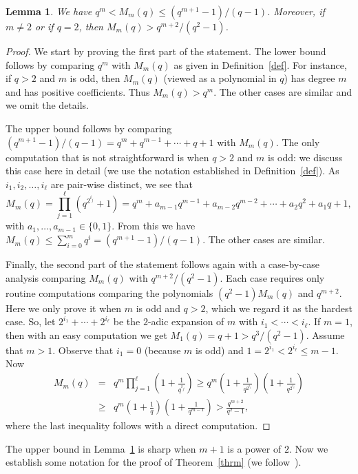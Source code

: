 \documentclass{amsart}
\newtheorem{lemma}[theorem]{Lemma}
\begin{document}
\begin{lemma}\label{estimate}We have $q^m< M_{m}(q)\leq (q^{m+1}-1)/(q-1)$. Moreover, if $m\neq 2$ or if $q=2$, then $M_m(q)>q^{m+2}/(q^2-1)$.
\end{lemma}
\begin{proof}
We start by proving the first part of the statement.
The lower bound follows by comparing $q^m$ with $M_m(q)$ as given in  Definition~\ref{def}. For instance, if $q>2$ and $m$ is odd, then $M_m(q)$  (viewed as a polynomial in $q$) has degree $m$ and has positive coefficients. Thus $M_m(q)>q^m$. The other cases are similar and we omit the details.

The upper bound follows by comparing $(q^{m+1}-1)/(q-1)=q^{m}+q^{m-1}+\cdots +q+1$ with $M_m(q)$. The only computation that is not straightforward is when $q>2$ and $m$ is odd: we discuss this case here in detail (we use the notation established in Definition~\ref{def}). As $i_1,i_2,\ldots ,i_\ell$ are pair-wise distinct, we see that $$M_m(q)=\prod_{j=1}^\ell(q^{2^{i_j}}+1)=q^m+a_{m-1}q^{m-1}+a_{m-2}q^{m-2}+\cdots +a_2q^2+a_1q+1,$$
with $a_1,\ldots,a_{m-1}\in \{0,1\}$. From this we have $M_m(q)\leq \sum_{i=0}^m q^i= (q^{m+1}-1)/(q-1)$. The other cases are similar.

Finally, the second part of the statement follows again with a case-by-case analysis comparing $M_m(q)$ with $q^{m+2}/(q^2-1)$. Each case requires only routine computations comparing the polynomials $(q^2-1)M_m(q)$ and $q^{m+2}$. Here we only prove it when $m$ is odd and $q>2$, which we regard it as the hardest case. So, let $2^{i_1}+\cdots +2^{i_\ell}$ be the $2$-adic expansion of $m$ with $i_1<\cdots <i_\ell$. If $m=1$, then with an easy computation we get $M_1(q)=q+1>q^3/(q^2-1)$. Assume that $m>1$. Observe that $i_1=0$ (because $m$ is odd) and $1=2^{i_1}<2^{i_\ell}\leq m-1$. Now
\begin{eqnarray*}
M_m(q)&=&
q^m\prod_{j=1}^\ell\left(1+\frac{1}{q^{i_j}}\right)\geq 
q^m\left(1+\frac{1}{q^{2^{i_1}}}\right)\left(1+\frac{1}{q^{2^{i_\ell}}}\right)\\
&\geq& q^m\left(1+\frac{1}{q}\right)\left(1+\frac{1}{q^{m-1}}\right)>\frac{q^{m+2}}{q^2-1},
\end{eqnarray*}
where the last inequality follows with a direct computation.
\end{proof}
 The upper bound in Lemma~\ref{estimate} is sharp when $m+1$  is a power of $2$. Now we establish some notation for the proof of Theorem~\ref{thrm} (we follow~\cite[Section~$2$]{DGPS}).
 
\end{document}
